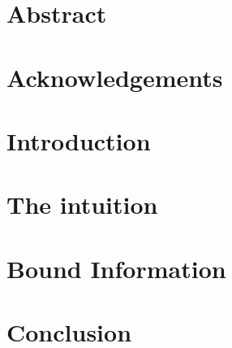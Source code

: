 \documentclass[titlepage]{report}
\begin{document}

\chapter*{Abstract}
\lipsum[1]
\chapter*{Acknowledgements}
\lipsum[13]
\tableofcontents

\chapter{Introduction}

		
\chapter{The intuition}

		
\chapter{Bound Information}

	
\chapter{Conclusion}


%
\printbibliography
\end{document}
